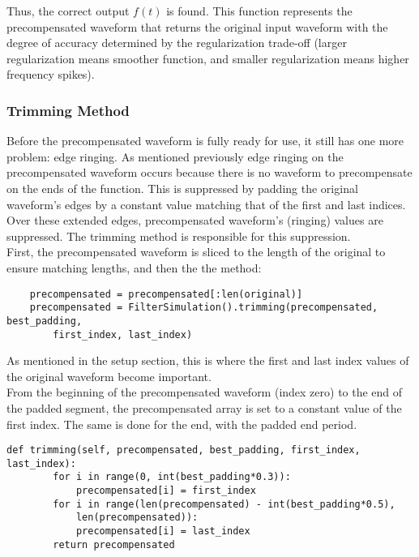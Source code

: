 \documentclass[11pt, a4paper]{article}
\theoremstyle{definition}
\numberwithin{equation}{section}
\begin{document}
Thus, the correct output $f(t)$ is found. This function represents the precompensated waveform that returns the original input waveform with the degree of accuracy determined by the regularization trade-off (larger regularization means smoother function, and smaller regularization means higher frequency spikes).

\subsubsection{Trimming Method}

Before the precompensated waveform is fully ready for use, it still has one more problem: edge ringing. As mentioned previously edge ringing on the precompensated waveform occurs because there is no waveform to precompensate on the ends of the function. This is suppressed by padding the original waveform's edges by a constant value matching that of the first and last indices. Over these extended edges, precompensated waveform's (ringing) values are suppressed. The trimming method is responsible for this suppression.
\\
First, the precompensated waveform is sliced to the length of the original to ensure matching lengths, and then the the method:

\begin{verbatim}
    precompensated = precompensated[:len(original)]
    precompensated = FilterSimulation().trimming(precompensated, best_padding, 
        first_index, last_index)
\end{verbatim}

As mentioned in the setup section, this is where the first and last index values of the original waveform become important.
\\
From the beginning of the precompensated waveform (index zero) to the end of the padded segment, the precompensated array is set to a constant value of the first index. The same is done for the end, with the padded end period.

\begin{verbatim}
def trimming(self, precompensated, best_padding, first_index, last_index):
        for i in range(0, int(best_padding*0.3)):
            precompensated[i] = first_index      
        for i in range(len(precompensated) - int(best_padding*0.5), 
            len(precompensated)):
            precompensated[i] = last_index
        return precompensated
\end{verbatim}
\end{document}
